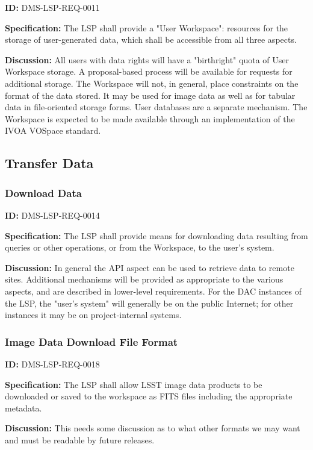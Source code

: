 \documentclass[SE,toc,lsstdraft]{lsstdoc}
\begin{document}
\label{DMS-LSP-REQ-0011}
\textbf{ID:} DMS-LSP-REQ-0011

\textbf{Specification:}
The LSP shall provide a "User Workspace": resources for the storage of user-generated data, which shall be accessible from all three aspects.

\textbf{Discussion:}
All users with data rights will have a "birthright" quota of User Workspace storage.  A proposal-based process will be available for requests for additional storage.  The Workspace will not, in general, place constraints on the format of the data stored.  It may be used for image data as well as for tabular data in file-oriented storage forms.  User databases are a separate mechanism.
The Workspace is expected to be made available through an implementation of the IVOA VOSpace standard.

\subsection{Transfer Data}

\subsubsection{Download Data}

\label{DMS-LSP-REQ-0014}
\textbf{ID:} DMS-LSP-REQ-0014

\textbf{Specification:}
The LSP shall provide means for downloading data resulting from queries or other operations, or from the Workspace, to the user's system.

\textbf{Discussion:}
In general the API aspect can be used to retrieve data to remote sites.  Additional mechanisms will be provided as appropriate to the various aspects, and are described in lower-level requirements.  For the DAC instances of the LSP, the "user's system" will generally be on the public Internet; for other instances it may be on project-internal systems.

\subsubsection{Image Data Download File Format}

\label{DMS-LSP-REQ-0018}
\textbf{ID:} DMS-LSP-REQ-0018

\textbf{Specification:}
The LSP shall allow LSST image data products to be downloaded or saved to the workspace as FITS files including the appropriate metadata.

\textbf{Discussion:}
This needs some discussion as to what other formats we may want and must be readable by future releases.
\end{document}
